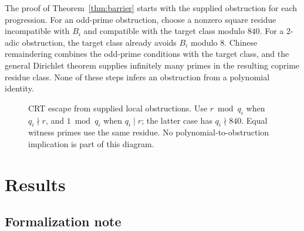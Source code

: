 \documentclass[11pt,a4paper]{article}
\theoremstyle{definition}
\begin{document}
The proof of Theorem~\ref{thm:barrier} starts with the supplied
obstruction for each progression. For an odd-prime obstruction, choose
a nonzero square residue incompatible with $B_i$ and compatible with
the target class modulo $840$. For a 2-adic obstruction, the target
class already avoids $B_i$ modulo $8$. Chinese remaindering combines
the odd-prime conditions with the target class, and the general
Dirichlet theorem supplies infinitely many primes in the resulting
coprime residue class. None of these steps infers an obstruction from
a polynomial identity.

\begin{figure}[t]
  \centering
  \caption{CRT escape from supplied local obstructions. Use $r\bmod q_i$
    when $q_i\nmid r$, and $1\bmod q_i$ when $q_i\mid r$; the latter
    case has $q_i\nmid840$. Equal witness primes use the same residue.
    No polynomial-to-obstruction implication is part of this diagram.}
  \label{fig:construction}
\end{figure}

\section{Results}

\subsection{Formalization note}
\end{document}
